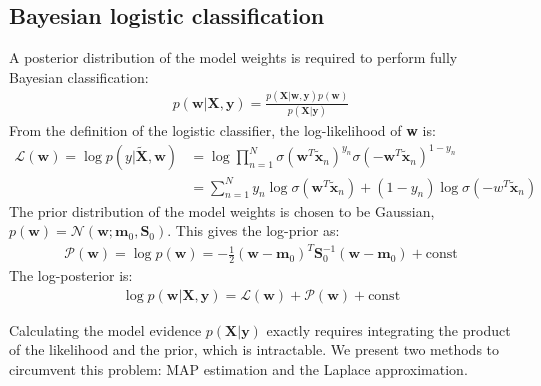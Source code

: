 \documentclass[a4paper]{article}
\begin{document}
    \subsection{Bayesian logistic classification}
    A posterior distribution of the model weights is required to perform fully Bayesian classification:
    \begin{align}
        p(\bm{w} | \bm{X}, \bm{y}) = \frac{p(\bm{X} | \bm{w}, \bm{y}) p(\bm w)}{p(\bm{X} | \bm{y})}
        \label{eq:posterior}
    \end{align}
    From the definition of the logistic classifier, the log-likelihood of \textbf{w} is:
    \begin{align}
        \mathcal{L}(\bm{w}) = \log p(y|\tilde{\bm{X}}, \bm{w})
        &= \log \prod_{n=1}^{N} \sigma( \bm{w}^T \tilde{\bm{x}}_n)^{y_n}
        \sigma (-\bm{w}^T \tilde{\bm{x}}_n)^{1-y_n} \nonumber \\
        &= \sum_{n=1}^{N} y_n \log\sigma( \bm{w}^T \tilde{\bm{x}}_n) + (1-y_n) \log\sigma(-w^T \tilde{\bm{x}}_n)
        \label{eq:log-likelihood}
    \end{align}
    The prior distribution of the model weights is chosen to be Gaussian, $p(\bm{w}) = \mathcal{N}(\bm{w}; \bm{m}_0, \bm{S}_0)$.
    This gives the log-prior as:
    \begin{align}
        \mathcal{P}(\bm{w}) = \log p(\bm{w}) = -\frac{1}{2}(\bm{w} - \bm{m}_0)^T \bm{S}_0^{-1} (\bm{w} - \bm{m}_0) + \text{const}
        \label{eq:log-prior}
    \end{align}
    The log-posterior is:
    \begin{align}
        \log p(\bm{w} | \bm{X}, \bm{y}) = \mathcal{L}(\bm{w}) + \mathcal{P}(\bm{w}) + \text{const}
        \label{eq:log-posterior}
    \end{align}

    Calculating the model evidence $p(\bm{X} | \bm{y})$ exactly requires integrating the product of the likelihood and the prior, which is intractable.
    We present two methods to circumvent this problem: MAP estimation and the Laplace approximation.
\end{document}

